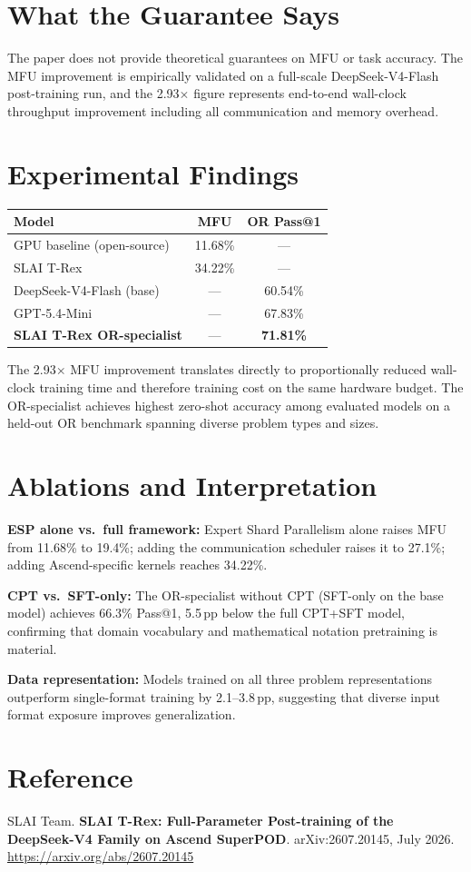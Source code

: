\documentclass[10pt,twocolumn]{article}
\begin{document}
\section{What the Guarantee Says}

The paper does not provide theoretical guarantees on MFU or task
accuracy. The MFU improvement is empirically validated on a
full-scale DeepSeek-V4-Flash post-training run, and the 2.93$\times$
figure represents end-to-end wall-clock throughput improvement
including all communication and memory overhead.

\section{Experimental Findings}

\begin{center}
\small
\begin{tabular}{lcc}
\toprule
Model & MFU & OR Pass@1 \\
\midrule
GPU baseline (open-source) & 11.68\% & --- \\
SLAI T-Rex & 34.22\% & --- \\
\midrule
DeepSeek-V4-Flash (base) & --- & 60.54\% \\
GPT-5.4-Mini & --- & 67.83\% \\
\textbf{SLAI T-Rex OR-specialist} & --- & \textbf{71.81\%} \\
\bottomrule
\end{tabular}
\end{center}

The 2.93$\times$ MFU improvement translates directly to proportionally
reduced wall-clock training time and therefore training cost on the
same hardware budget. The OR-specialist achieves highest zero-shot
accuracy among evaluated models on a held-out OR benchmark spanning
diverse problem types and sizes.

\section{Ablations and Interpretation}

\textbf{ESP alone vs.\ full framework:} Expert Shard Parallelism
alone raises MFU from 11.68\% to 19.4\%; adding the communication
scheduler raises it to 27.1\%; adding Ascend-specific kernels
reaches 34.22\%.

\textbf{CPT vs.\ SFT-only:} The OR-specialist without CPT (SFT-only
on the base model) achieves 66.3\% Pass@1, 5.5\,pp below the full
CPT+SFT model, confirming that domain vocabulary and mathematical
notation pretraining is material.

\textbf{Data representation:} Models trained on all three problem
representations outperform single-format training by 2.1--3.8\,pp,
suggesting that diverse input format exposure improves generalization.

\section*{Reference}

SLAI Team.
\textbf{SLAI T-Rex: Full-Parameter Post-training of the DeepSeek-V4
Family on Ascend SuperPOD}.
arXiv:2607.20145, July 2026.
\url{https://arxiv.org/abs/2607.20145}
\end{document}
